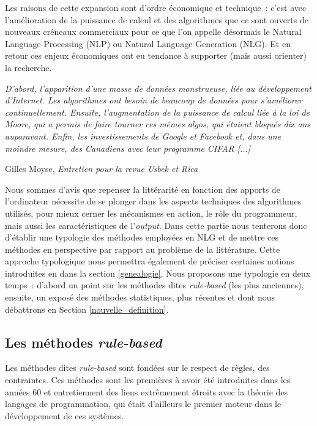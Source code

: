 \documentclass{article}
\newenvironment{citationbox}
{\begin{center}
		\begin{minipage}{.8\textwidth}
		}
		{
		\end{minipage}	
\end{center}
}
\begin{document}
		Les raisons de cette expansion sont d'ordre économique et technique~: c'est avec l'amélioration de la puissance de calcul et des algorithmes que ce sont ouverts de nouveaux créneaux commerciaux pour ce que l'on appelle désormais le Natural Language Processing (NLP) ou Natural Language Generation (NLG). Et en retour ces enjeux économiques ont eu tendance à supporter (mais aussi orienter) la recherche.\\
		\begin{citationbox}
			\textit{D’abord, l’apparition d’une masse de données monstrueuse, liée au développement d’Internet. Les algorithmes ont besoin de beaucoup de données pour s’améliorer continuellement. Ensuite, l’augmentation de la puissance de calcul liée à la loi de Moore, qui a permis de faire tourner ces mêmes algos, qui étaient bloqués dix ans auparavant. Enfin, les investissements de Google et Facebook et, dans une moindre mesure, des Canadiens avec leur programme CIFAR [...]}
			\begin{flushright}
				Gilles Moyse, \textit{Entretien pour la revue Usbek et Rica} \cite{edin2018}
			\end{flushright}
		\end{citationbox}
		Nous sommes d'avis que repenser la littérarité en fonction des apports de l'ordinateur nécessite de se plonger dans les aspects techniques des algorithmes utilisés, pour mieux cerner les mécanismes en action, le rôle du programmeur, mais aussi les caractéristiques de l'\textit{output}. Dans cette partie nous tenterons donc d'établir une typologie des méthodes employées en NLG et de mettre ces méthodes en perspective par rapport au problème de la littérature. Cette approche typologique nous permettra également de préciser certaines notions introduites en dans la section \ref{genealogie}. Nous proposons une typologie en deux temps~: d'abord un point sur les méthodes dites \textit{rule-based} (les plus anciennes), ensuite, un exposé des méthodes statistiques, plus récentes et dont nous débattrons en Section \ref{nouvelle_definition}.
		
		\subsection{Les méthodes \textit{rule-based}}
			Les méthodes dites \textit{rule-based} sont fondées sur le respect de règles, des contraintes. Ces méthodes sont les premières à avoir été introduites dans les années 60 et entretiennent des liens extrêmement étroits avec la théorie des langages de programmation, qui était d'ailleurs le premier moteur dans le développement de ces systèmes.
\end{document}
